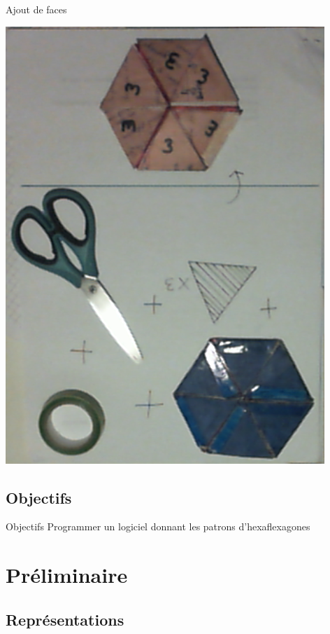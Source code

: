 \documentclass[french,xcolor=dvipsnames]{beamer}
\begin{document}
		\begin{frame}{Ajout de faces}
		
		\begin{center}
		\includegraphics[scale=0.3]{outils_ajout_face.png}
		\end{center}
		\end{frame}
		
		\subsection{Objectifs}
		\begin{frame}{Objectifs}
			Programmer un logiciel donnant les patrons d'hexaflexagones
		\end{frame}


	\section{Préliminaire}

		\subsection{Représentations}
\end{document}
